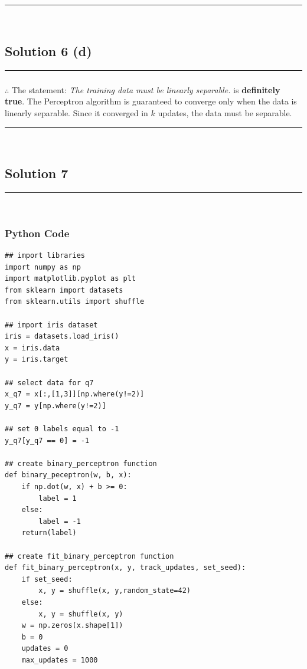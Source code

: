 \documentclass{article}
\begin{document}
{\noindent\rule{\textwidth}{0.4pt}\\

\subsection*{Solution 6 (d)}
\noindent\rule{\textwidth}{0.4pt}

\subsubsection*{\normalfont}{$\therefore$ The statement: \textit{The training data must be linearly separable.} is \textbf{definitely true}. The Perceptron algorithm is guaranteed to converge only when the data is linearly separable. Since it converged in $k$ updates, the data must be separable.}

\noindent\rule{\textwidth}{0.4pt}\\

\newpage

\subsection*{Solution 7}

\noindent\rule{\textwidth}{0.4pt}\\

\subsubsection*{Python Code}

\begin{lstlisting}
## import libraries
import numpy as np
import matplotlib.pyplot as plt
from sklearn import datasets
from sklearn.utils import shuffle

## import iris dataset
iris = datasets.load_iris()
x = iris.data
y = iris.target

## select data for q7
x_q7 = x[:,[1,3]][np.where(y!=2)]
y_q7 = y[np.where(y!=2)]

## set 0 labels equal to -1
y_q7[y_q7 == 0] = -1

## create binary_perceptron function
def binary_peceptron(w, b, x):
    if np.dot(w, x) + b >= 0:
        label = 1
    else:
        label = -1
    return(label)
    
## create fit_binary_perceptron function
def fit_binary_perceptron(x, y, track_updates, set_seed):
    if set_seed:
        x, y = shuffle(x, y,random_state=42)
    else:
        x, y = shuffle(x, y)
    w = np.zeros(x.shape[1])
    b = 0
    updates = 0
    max_updates = 1000


\end{lstlisting}}
\end{document}
